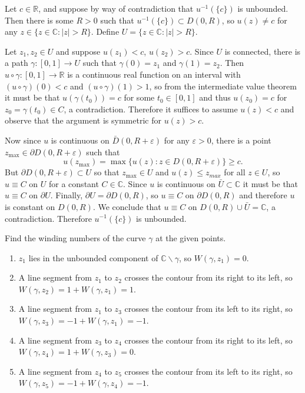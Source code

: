 \documentclass{article}
\newcounter{Problem}
\newenvironment{Problem}{\begin{Exercise}[name={Problem},
                                          counter={Problem}]}
                        {\end{Exercise}}
\begin{document}
\begin{Answer}
Let $c \in \mathbb{R}$, and suppose by way of contradiction that
$u^{-1}(\{ c \})$ is unbounded. Then there is some $R > 0$ such that
$u^{-1}(\{ c \}) \subset D(0, R)$, so $u(z) \neq c$ for any
$z \in \{ z \in \mathbb{C} : |z| > R \}$. Define
$U = \{ z \in \mathbb{C} : |z| > R \}$.

Let $z_1, z_2 \in U$ and suppose $u(z_1) < c$, $u(z_2) > c$.
Since $U$ is connected, there is a path
$\gamma : [0, 1] \to U$ such that $\gamma(0) = z_1$ and
$\gamma(1) = z_2$. Then
$u \circ \gamma : [0, 1] \to \mathbb{R}$ is a continuous
real function on an interval
with $(u \circ \gamma)(0) < c$ and
$(u \circ \gamma)(1) > 1$, so from the intermediate value
theorem it must be that $u(\gamma(t_0)) = c$ for some
$t_0 \in [0, 1]$ and thus
$u(z_0) = c$ for $z_0 = \gamma(t_0) \in C$, a contradiction.
Therefore it suffices to assume $u(z) < c$
and observe that the argument is symmetric for $u(z) > c$.

Now since $u$ is continuous on $\bar{D}(0, R + \varepsilon)$
for any $\varepsilon > 0$, there is a
point $z_{\max} \in \partial D(0, R + \varepsilon)$ such that
$$
u(z_{\max}) = \max\{ u(z) : z \in D(0, R + \varepsilon) \} \geq c.
$$
But $\partial D(0, R + \varepsilon) \subset U$ so that
$z_{\max} \in U$ and $u(z) \leq z_{max}$
for all $z \in U$, so $u \equiv C$ on $U$ for a constant
$C \in \mathbb{C}$. Since $u$ is continuous on
$\bar{U} \subset \mathbb{C}$ it must be that $u \equiv C$ on
$\partial U$.
Finally, $\partial U = \partial D(0, R)$, so $u \equiv C$ on
$\partial D(0, R)$ and therefore $u$ is constant on $D(0, R)$.
We conclude that $u \equiv C$ on
$D(0, R) \cup \bar{U} = \mathbb{C}$, a contradiction.
Therefore $u^{-1}(\{ c \})$ is unbounded.
\end{Answer}

\begin{Problem}
Find the winding numbers of the curve $\gamma$ at the given points.
\end{Problem}

\begin{Answer}
\begin{enumerate}
  \item{
    $z_1$ lies in the unbounded component of
    $\mathbb{C} \backslash \gamma$, so $W(\gamma, z_1) = 0$.
  }
  \item{
    A line segment from $z_1$ to $z_2$ crosses the contour from its
    right to its left, so $W(\gamma, z_2) = 1 + W(\gamma, z_1) = 1$.
  }
  \item{
    A line segment from $z_1$ to $z_3$ crosses the contour from its
    left to its right, so $W(\gamma, z_3) = -1 + W(\gamma, z_1) = -1$.
  }
  \item{
    A line segment from $z_3$ to $z_4$ crosses the contour from its
    right to its left, so $W(\gamma, z_4) = 1 + W(\gamma, z_3) = 0$.
  }
  \item{
    A line segment from $z_4$ to $z_5$ crosses the contour from its
    left to its right, so $W(\gamma, z_5) = -1 + W(\gamma, z_4) = -1$.
  }
\end{enumerate}
\end{Answer}
\end{document}
